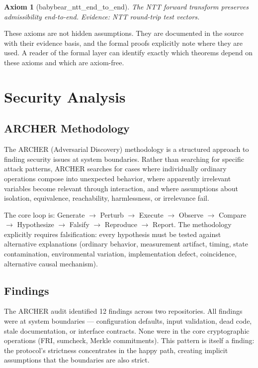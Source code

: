 \documentclass[11pt,a4paper]{article}
\newtheorem{axiom}{Axiom}
\begin{document}
\begin{axiom}[babybear\_ntt\_end\_to\_end]
The NTT forward transform preserves admissibility end-to-end. Evidence: NTT round-trip test vectors.
\end{axiom}

These axioms are not hidden assumptions. They are documented in the source with their evidence basis, and the formal proofs explicitly note where they are used. A reader of the formal layer can identify exactly which theorems depend on these axioms and which are axiom-free.

\section{Security Analysis}
\label{sec:security}

\subsection{ARCHER Methodology}

The ARCHER (Adversarial Discovery) methodology is a structured approach to finding security issues at system boundaries. Rather than searching for specific attack patterns, ARCHER searches for cases where individually ordinary operations compose into unexpected behavior, where apparently irrelevant variables become relevant through interaction, and where assumptions about isolation, equivalence, reachability, harmlessness, or irrelevance fail.

The core loop is: Generate $\to$ Perturb $\to$ Execute $\to$ Observe $\to$ Compare $\to$ Hypothesize $\to$ Falsify $\to$ Reproduce $\to$ Report. The methodology explicitly requires falsification: every hypothesis must be tested against alternative explanations (ordinary behavior, measurement artifact, timing, state contamination, environmental variation, implementation defect, coincidence, alternative causal mechanism).

\subsection{Findings}

The ARCHER audit identified 12 findings across two repositories. All findings were at system boundaries --- configuration defaults, input validation, dead code, stale documentation, or interface contracts. None were in the core cryptographic operations (FRI, sumcheck, Merkle commitments). This pattern is itself a finding: the protocol's strictness concentrates in the happy path, creating implicit assumptions that the boundaries are also strict.
\end{document}
